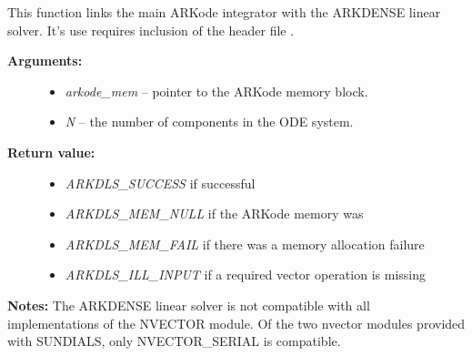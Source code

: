 \documentclass[letterpaper,10pt,english]{sphinxmanual}
\begin{document}
\begin{fulllineitems}
\label{c_interface/User_callable:ARKDense}
This function links the main ARKode integrator with the ARKDENSE
linear solver.  It's use requires inclusion of the header file
.
\begin{description}
\item[{\textbf{Arguments:}}] \leavevmode\begin{itemize}
\item {} 
\emph{arkode\_mem} -- pointer to the ARKode memory block.

\item {} 
\emph{N} -- the number of components in the ODE system.

\end{itemize}

\item[{\textbf{Return value:}}] \leavevmode\begin{itemize}
\item {} 
\emph{ARKDLS\_SUCCESS}   if successful

\item {} 
\emph{ARKDLS\_MEM\_NULL}  if the ARKode memory was 

\item {} 
\emph{ARKDLS\_MEM\_FAIL}  if there was a memory allocation failure

\item {} 
\emph{ARKDLS\_ILL\_INPUT} if a required vector operation is missing

\end{itemize}

\end{description}

\textbf{Notes:}  The ARKDENSE linear solver is not compatible with
all implementations of the NVECTOR module. Of the two nvector
modules provided with SUNDIALS, only NVECTOR\_SERIAL is compatible.

\end{fulllineitems}

\end{document}

